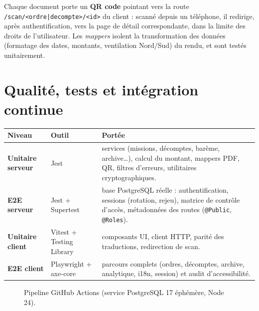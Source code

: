 \documentclass[10.5pt,a4paper]{article}
\newcommand{\code}[1]{\texttt{\small #1}}
\begin{document}
Chaque document porte un \textbf{QR code} pointant vers la route \code{/scan/<ordre|decompte>/<id>} du client :
scanné depuis un téléphone, il redirige, après authentification, vers la page de détail correspondante,
dans la limite des droits de l'utilisateur. Les \emph{mappers} isolent la transformation des données
(formatage des dates, montants, ventilation Nord/Sud) du rendu, et sont testés unitairement.

\section{Qualité, tests et intégration continue}

\begin{tabularx}{\textwidth}{@{}>{\bfseries}l l X@{}}
\toprule
Niveau & Outil & Portée \\
\midrule
Unitaire serveur & Jest & services (missions, décomptes, barème, archive…), calcul du montant, mappers PDF, QR, filtres d'erreurs, utilitaires cryptographiques. \\
E2E serveur & Jest + Supertest & base PostgreSQL réelle : authentification, sessions (rotation, rejeu), matrice de contrôle d'accès, métadonnées des routes (\code{@Public}, \code{@Roles}). \\
Unitaire client & Vitest + Testing Library & composants UI, client HTTP, parité des traductions, redirection de scan. \\
E2E client & Playwright + axe-core & parcours complets (ordres, décomptes, archive, analytique, i18n, session) et audit d'accessibilité. \\
\bottomrule
\end{tabularx}

\begin{figure}[h]
\centering
{}
\caption{Pipeline GitHub Actions (service PostgreSQL 17 éphémère, Node 24).}
\end{figure}
\end{document}
